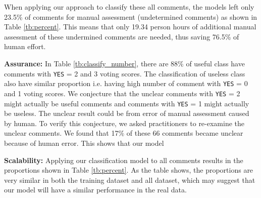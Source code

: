 When applying our approach to classify these all comments, the models left only 23.5\% of comments for manual assessment (undetermined comments) as shown in Table \ref{tb:percent}.
This means that only 19.34 person hours of additional manual assessment of these undermined comments are needed, thus saving 76.5\% of human effort.

%
%
%

\textbf{Assurance:} In Table \ref{tb:classify_number}, there are 88\% of useful class have comments with \texttt{YES} = 2 and 3 voting scores. The classification of useless class also have similar proportion i.e. having high number of comment with \texttt{YES} = 0 and 1 voting scores. We conjecture that the unclear comments with \texttt{YES} = 2 might actually be useful comments and comments with \texttt{YES} = 1 might actually be useless. The unclear result could be from error of manual assessment caused by human.
To verify this conjecture, we asked practitioners to re-examine the unclear comments.
We found that 17\% of these 66 comments became unclear because of human error.
This shows that our model 




\textbf{Scalability:} Applying our classification model to all comments results in the proportions shown in Table \ref{tb:percent}.
As the table shows, the proportions are very similar in both the training dataset and all dataset,
which may suggest that our model will have a similar performance in the real data.

